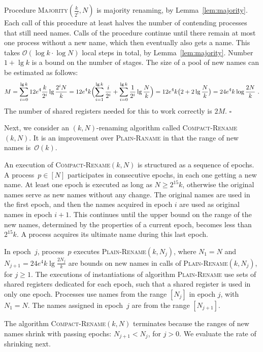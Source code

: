 \documentclass[11pt]{article}
\newcommand{\cO}{\mathcal{O}}
\newcommand{\qed}{\hfill $\square$ \smallbreak}
\newenvironment{proof}{\noindent{\bf Proof:}}{\qed}
\begin{document}
\begin{proof}
Procedure \textsc{Majority}$(\frac{k}{2^i},N)$ is majority renaming, by Lemma~\ref{lem:majority}.
Each call of this procedure at least halves the number of contending processes that still need names.
Calls of the procedure continue until there remain at most one process without a new name, which then eventually also gets a name. 
This takes $\cO(\log k \cdot \log N)$ local steps in total,  by Lemma~\ref{lem:majority}.
Number $1+\lg k $ is a bound on the number of stages.
The size of a pool of new names can be estimated as follows: 
\[
M=\sum_{i=0}^{\lg k} 12e^4\frac{k}{2^i} \lg\frac{2^i N}{k} 
= 12e^4 k  \Bigl( \sum_{i=1}^{\lg k} \frac{i}{2^i}+\sum_{i=0}^{\lg k}  \frac{1}{2^i}\lg\frac{N}{k} \Bigr)
=12e^4 k \bigl(2 + 2\lg\frac{N}{k} \bigr)
= 24e^4k\log\frac{2N}{k}
\ .
\]
The number of  shared registers needed for this to work correctly is $2M$.  
\end{proof}



Next, we consider an $(k,N)$-renaming algorithm called \textsc{Compact-Rename}$(k,N)$. 
It is an improvement over \textsc{Plain-Raname} in that the range of new names is~$\cO(k)$.

An execution of \textsc{Compact-Rename}$(k,N)$ is structured as a sequence of epochs.
A process~$p\in [N]$ participates in consecutive epochs, in each one getting a new name.
At least one epoch is executed as long as $N\ge 2^{15}k$, otherwise the original names serve as new names without any change.
The original names are used in the first epoch, and then the names acquired in epoch $i$ are used as original names in epoch $i+1$.  
This continues until the upper bound on the range of the new names, determined by the properties of a current epoch, becomes less than~$2^{15}k$.
A process acquires its ultimate name during this last epoch.

In epoch~$j$, process~$p$ executes \textsc{Plain-Rename}$(k,N_j)$, where $N_1=N$ and $N_{j+1}=24e^4k\lg\frac{2N_j}{k}$ are bounds on new names in calls of \textsc{Plain-Rename}$(k,N_j)$, for $j\ge 1$.
The executions of instantiations of algorithm \textsc{Plain-Rename} use sets of shared registers dedicated for each epoch, such that a shared register is used in only one epoch.
Processes use names from the range $[N_j]$ in epoch $j$,  with $N_1=N$.
The names assigned in epoch~$j$ are from the range $[N_{j+1}]$.

The algorithm \textsc{Compact-Rename}$(k,N)$ terminates because the ranges of new names shrink with passing epochs: $N_{j+1}<N_j$, for $j>0$.
We evaluate the rate of shrinking next.
\end{document}
